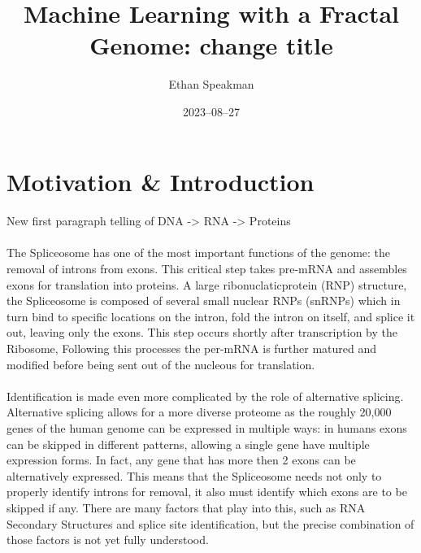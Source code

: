 \documentclass[12pt]{article}
\title{Machine Learning with a Fractal Genome: change title}
\author{Ethan Speakman}
\date{2023–08–27}
\begin{document}
\maketitle

\section{Motivation \& Introduction}
\paragraph*{}
New first paragraph telling of DNA -> RNA -> Proteins
\paragraph*{}
The Spliceosome has one of the most important functions of the genome: the removal of introns from exons. 
This critical step takes pre-mRNA and assembles exons for translation into proteins. 
A large ribonuclaticprotein (RNP) structure, the Spliceosome is composed of several small nuclear RNPs (snRNPs) which in turn bind to specific locations on the intron, fold the intron on itself, and splice it out, leaving only the exons\cite{will2011spliceosome}\cite{matera2014day}.
This step occurs shortly after transcription by the Ribosome, 
Following this processes the per-mRNA is further matured and modified before being sent out of the nucleous for translation.
\paragraph*{}
Identification is made even more complicated by the role of alternative splicing.
Alternative splicing allows for a more diverse proteome as the roughly 20,000 genes of the human genome can be expressed in multiple ways: in humans exons can be skipped in different patterns, allowing a single gene have multiple expression forms.
In fact, any gene that has more then 2 exons can be alternatively expressed.
This means that the Spliceosome needs not only to properly identify introns for removal, it also must identify which exons are to be skipped if any.
There are many factors that play into this, such as RNA Secondary Structures and splice site identification, but the precise combination of those factors is not yet fully understood.
\end{document}
